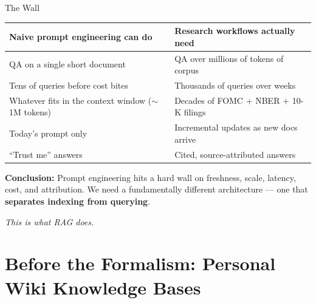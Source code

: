 \begin{frame}{The Wall}
\begin{center}
\renewcommand{\arraystretch}{1.4}
\begin{tabular}{|p{5.5cm}|p{8cm}|}
\hline
\textbf{Naive prompt engineering can do} & \textbf{Research workflows actually need} \\
\hline
QA on a single short document & QA over millions of tokens of corpus \\
\hline
Tens of queries before cost bites & Thousands of queries over weeks \\
\hline
Whatever fits in the context window ($\sim$1M tokens) & Decades of FOMC + NBER + 10-K filings \\
\hline
Today's prompt only & Incremental updates as new docs arrive \\
\hline
``Trust me'' answers & Cited, source-attributed answers \\
\hline
\end{tabular}
\end{center}

\bigskip
\textbf{Conclusion:} Prompt engineering hits a hard wall on freshness, scale, latency, cost, and attribution. We need a fundamentally different architecture --- one that \textbf{separates indexing from querying}.

\bigskip
\centering\emph{This is what RAG does.}
\end{frame}

\section{Before the Formalism: Personal Wiki Knowledge Bases}


